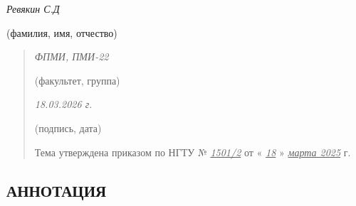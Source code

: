 \emph{Ревякин С.Д}

(фамилия, имя, отчество)

\begin{quote}
\emph{ФПМИ, ПМИ-22}

(факультет, группа)

\emph{18.03.2026 г.}

(подпись, дата)

Тема утверждена приказом по НГТУ № \emph{\ul{1501/2}} от «
\emph{\ul{18}} » \emph{\ul{марта 2025}} г.
\end{quote}

\hypertarget{ux430ux43dux43dux43eux442ux430ux446ux438ux44f}{%
\subsection*{АННОТАЦИЯ}\label{ux430ux43dux43dux43eux442ux430ux446ux438ux44f}}

